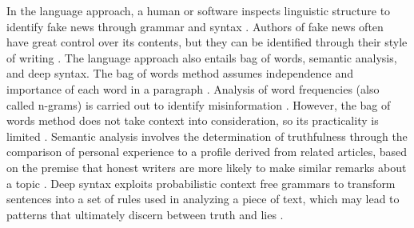 In the language approach, a human or software inspects linguistic structure to identify fake news through grammar and syntax \cite{burkhardt2017history}. Authors of fake news often have great control over its contents, but they can be identified through their style of writing \cite{yang2018ti-cnn}. The language approach also entails bag of words, semantic analysis, and deep syntax. The bag of words method assumes independence and importance of each word in a paragraph \cite{burkhardt2017history}. Analysis of word frequencies (also called n-grams) is carried out to identify misinformation \cite{thota2018fake}. However, the bag of words method does not take context into consideration, so its practicality is limited \cite{potthast2017stylometric}. Semantic analysis involves the determination of truthfulness through the comparison of personal experience to a profile derived from related articles, based on the premise that honest writers are more likely to make similar remarks about a topic \cite{chen2015news}. Deep syntax exploits probabilistic context free grammars to transform sentences into a set of rules used in analyzing a piece of text, which may lead to patterns that ultimately discern between truth and lies \cite{zhou2018fake, Stahl2018FakeND}.

